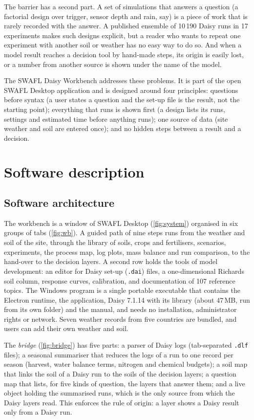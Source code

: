 \documentclass[preprint,12pt]{elsarticle}
\begin{document}
The barrier has a second part. A set of simulations that answers a question (a factorial design over trigger, sensor depth and rain, say) is a piece of work that is rarely recorded with the answer. A published ensemble of 10\,190 Daisy runs in 17 experiments \cite{HaliluData} makes such designs explicit, but a reader who wants to repeat one experiment with another soil or weather has no easy way to do so. And when a model result reaches a decision tool by hand-made steps, its origin is easily lost, or a number from another source is shown under the name of the model.

The SWAFL Daisy Workbench addresses these problems. It is part of the open SWAFL Desktop application and is designed around four principles: questions before syntax (a user states a question and the set-up file is the result, not the starting point); everything that runs is shown first (a design lists its runs, settings and estimated time before anything runs); one source of data (site weather and soil are entered once); and no hidden steps between a result and a decision.

\section{Software description}
\subsection{Software architecture}
The workbench is a window of SWAFL Desktop (\cref{fig:system}) organised in six groups of tabs (\cref{fig:wb}). A guided path of nine steps runs from the weather and soil of the site, through the library of soils, crops and fertilisers, scenarios, experiments, the process map, log plots, mass balance and run comparison, to the hand-over to the decision layers. A second row holds the tools of model development: an editor for Daisy set-up (\texttt{.dai}) files, a one-dimensional Richards soil column, response curves, calibration, and documentation of 107 reference topics. The Windows program is a single portable executable that contains the Electron runtime, the application, Daisy 7.1.14 with its library (about 47\,MB, run from its own folder) and the manual, and needs no installation, administrator rights or network. Seven weather records from five countries are bundled, and users can add their own weather and soil.


The \emph{bridge} (\cref{fig:bridge}) has five parts: a parser of Daisy logs (tab-separated \texttt{.dlf} files); a seasonal summariser that reduces the logs of a run to one record per season (harvest, water balance terms, nitrogen and chemical budgets); a soil map that links the soil of a Daisy run to the soils of the decision layers; a question map that lists, for five kinds of question, the layers that answer them; and a live object holding the summarised runs, which is the only source from which the Daisy layers read. This enforces the rule of origin: a layer shows a Daisy result only from a Daisy run.
\end{document}
